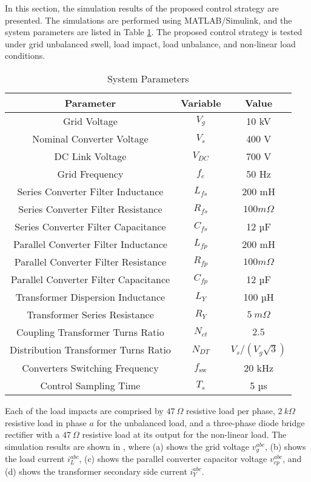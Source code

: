 
In this section, the simulation results of the proposed control strategy are presented. The simulations are performed using MATLAB/Simulink, and the system parameters are listed in Table \ref{tab:params}. The proposed control strategy is tested under grid unbalanced swell, load impact, load unbalance, and non-linear load conditions.

\begin{table}[h!]
    \centering
    \caption{System Parameters}
    \begin{tabular}{|c|c|c|}
        \hline
        Parameter & Variable & Value \\
        \hline
        \hline
        Grid Voltage & $V_{g}$ & 10 kV \\
        Nominal Converter Voltage & $V_s$ & 400 V \\
        DC Link Voltage & $V_{DC}$ & 700 V \\
        Grid Frequency & $f_e$ & 50 Hz \\
        Series Converter Filter Inductance & $L_{fs}$ & 200 mH \\
        Series Converter Filter Resistance & $R_{fs}$ & $100 m\Omega$ \\
        Series Converter Filter Capacitance & $C_{fs}$ & 12 µF \\
        Parallel Converter Filter Inductance & $L_{fp}$ & 200 mH \\
        Parallel Converter Filter Resistance & $R_{fp}$ & $100 m\Omega$ \\
        Parallel Converter Filter Capacitance & $C_{fp}$ & 12 µF \\
        Transformer Dispersion Inductance & $L_Y$ & 100 µH \\
        Transformer Series Resistance & $R_Y$ & $5\ m\Omega$\\
        Coupling Transformer Turns Ratio & $N_{ct}$ & $2.5$ \\
        Distribution Transformer Turns Ratio & $N_{DT}$ & $V_s/(V_g\sqrt{3})$ \\
        Converters Switching Frequency & $f_{\text{sw}}$ & 20 kHz \\
        Control Sampling Time & $T_s$ & 5 µs \\
        \hline
    \end{tabular}
    \label{tab:params}
\end{table}

Each of the load impacts are comprised by $47\ \Omega$ resistive load per phase, $2\ k\Omega$ resistive load in phase $a$ for the unbalanced load, and a three-phase diode bridge rectifier with a $47\ \Omega$ resistive load at its output for the non-linear load. The simulation results are shown in , where (a) shows the grid voltage $v_g^{abc}$, (b) shows the load current $i_L^{abc}$, (c) shows the parallel converter capacitor voltage $v_{cp}^{abc}$, and (d) shows the transformer secondary side current $i_Y^{abc}$.

